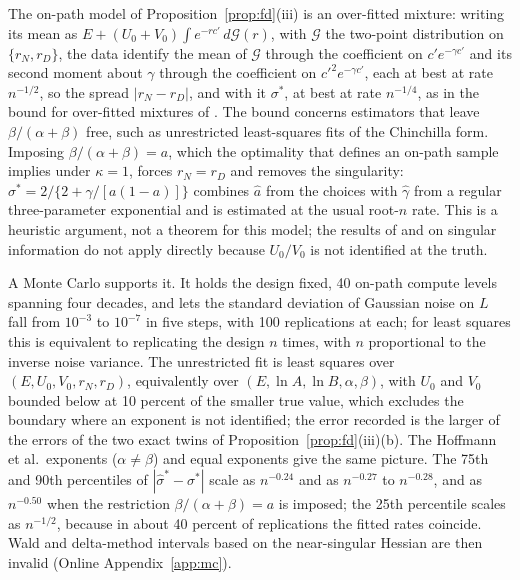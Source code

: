 \begin{remark}\label{rem:A-rate}
The on-path model of Proposition~\ref{prop:fd}(iii) is an over-fitted mixture: writing its mean as
$E+(U_0+V_0)\int e^{-rc'}\,d\mathcal G(r)$, with $\mathcal G$ the two-point distribution on $\{r_N,r_D\}$, the data
identify the mean of $\mathcal G$ through the coefficient on $c'e^{-\gamma c'}$ and its second moment about $\gamma$
through the coefficient on $c'^2e^{-\gamma c'}$, each at
best at rate $n^{-1/2}$, so the spread $|r_N-r_D|$, and with it $\sigma^*$, at best at rate $n^{-1/4}$, as in the bound
for over-fitted mixtures of \citet{chen1995optimal}. The bound concerns estimators that leave $\beta/(\alpha+\beta)$ free,
such as unrestricted least-squares fits of the Chinchilla form. Imposing $\beta/(\alpha+\beta)=a$, which the optimality
that defines an on-path sample implies under $\kappa=1$, forces $r_N=r_D$ and removes the singularity:
$\sigma^*=2/\{2+\gamma/[a(1-a)]\}$ combines $\hat a$ from the choices with $\hat\gamma$ from a regular three-parameter
exponential and is estimated at the usual root-$n$ rate. This is a heuristic argument, not a theorem for this model; the
results of \citet{sargan1983identification} and \citet{rotnitzky2000likelihood} on singular information do not apply
directly because $U_0/V_0$ is not identified at the truth.

A Monte Carlo supports it. It holds the design fixed, 40 on-path compute levels spanning four decades, and lets the
standard deviation of Gaussian noise on $L$ fall from $10^{-3}$ to $10^{-7}$ in five steps, with 100 replications at each;
for least squares this is equivalent to replicating the design $n$ times, with $n$ proportional to the inverse noise
variance. The unrestricted fit is least squares over $(E,U_0,V_0,r_N,r_D)$, equivalently over $(E,\ln A,\ln B,\alpha,\beta)$,
with $U_0$ and $V_0$ bounded below at 10 percent of the smaller true value, which excludes the boundary where an exponent is
not identified; the error recorded is the larger of the errors of the two exact twins of Proposition~\ref{prop:fd}(iii)(b).
The Hoffmann et al.\ exponents ($\alpha\ne\beta$) and equal exponents give the same picture. The 75th and 90th
percentiles of $|\hat\sigma^*-\sigma^*|$ scale as $n^{-0.24}$ and as $n^{-0.27}$ to $n^{-0.28}$, and as $n^{-0.50}$ when
the restriction $\beta/(\alpha+\beta)=a$ is imposed; the 25th percentile scales as $n^{-1/2}$, because in about 40 percent
of replications the fitted rates coincide. Wald and delta-method intervals based on the near-singular Hessian are then
invalid (Online Appendix~\ref{app:mc}).
\end{remark}

